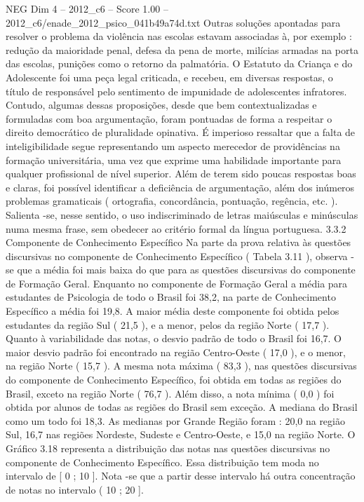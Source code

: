 \begin{textsample}{NEG Dim 4 – 2012\_c6 – Score 1.00 – 2012\_c6/enade\_2012\_psico\_041b49a74d.txt}
Outras soluções apontadas para resolver o problema da violência nas escolas estavam associadas à, por exemplo : redução da maioridade penal, defesa da pena de morte, milícias armadas na porta das escolas, punições como o retorno da palmatória.
O Estatuto da Criança e do Adolescente foi uma peça legal criticada, e recebeu, em diversas respostas, o título de responsável pelo sentimento de impunidade de adolescentes infratores.
Contudo, algumas dessas proposições, desde que bem contextualizadas e formuladas com boa argumentação, foram pontuadas de forma a respeitar o direito democrático de pluralidade opinativa.
É imperioso ressaltar que a falta de inteligibilidade segue representando um aspecto merecedor de providências na formação universitária, uma vez que exprime uma habilidade importante para qualquer profissional de nível superior.
Além de terem sido poucas respostas boas e claras, foi possível identificar a deficiência de argumentação, além dos inúmeros problemas gramaticais ( ortografia, concordância, pontuação, regência, etc. ).
Salienta -se, nesse sentido, o uso indiscriminado de letras maiúsculas e minúsculas numa mesma frase, sem obedecer ao critério formal da língua portuguesa. 3.3.2 Componente de Conhecimento Específico Na parte da prova relativa às questões discursivas no componente de Conhecimento Específico ( Tabela 3.11 ), observa -se que a média foi mais baixa do que para as questões discursivas do componente de Formação Geral.
Enquanto no componente de Formação Geral a média para estudantes de Psicologia de todo o Brasil foi 38,2, na parte de Conhecimento Específico a média foi 19,8.
A maior média deste componente foi obtida pelos estudantes da região Sul ( 21,5 ), e a menor, pelos da região Norte ( 17,7 ).
Quanto à variabilidade das notas, o desvio padrão de todo o Brasil foi 16,7.
O maior desvio padrão foi encontrado na região Centro-Oeste ( 17,0 ), e o menor, na região Norte ( 15,7 ).
A mesma nota máxima ( 83,3 ), nas questões discursivas do componente de Conhecimento Específico, foi obtida em todas as regiões do Brasil, exceto na região Norte ( 76,7 ).
Além disso, a nota mínima ( 0,0 ) foi obtida por alunos de todas as regiões do Brasil sem exceção.
A mediana do Brasil como um todo foi 18,3.
As medianas por Grande Região foram : 20,0 na região Sul, 16,7 nas regiões Nordeste, Sudeste e Centro-Oeste, e 15,0 na região Norte.
O Gráfico 3.18 representa a distribuição das notas nas questões discursivas no componente de Conhecimento Específico.
Essa distribuição tem moda no intervalo de [ 0 ; 10 ].
Nota -se que a partir desse intervalo há outra concentração de notas no intervalo ( 10 ; 20 ].

\end{textsample}
